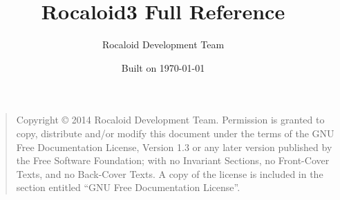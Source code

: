 

\author{Rocaloid Development Team}
\title{Rocaloid3 Full Reference}
\date{Built on \today}



\maketitle

\newpage

\vspace*{\fill}
\begin{quote}
    Copyright \copyright{}  2014 Rocaloid Development Team.
    Permission is granted to copy, distribute and/or modify this document
    under the terms of the GNU Free Documentation License, Version 1.3
    or any later version published by the Free Software Foundation;
    with no Invariant Sections, no Front-Cover Texts, and no Back-Cover Texts.
    A copy of the license is included in the section entitled ``GNU
    Free Documentation License''.
\end{quote}
\vspace*{\fill}

\tableofcontents







